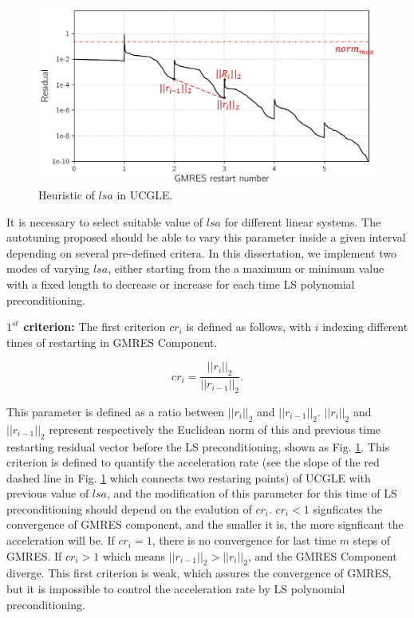 \begin{figure}[htbp]
	\centering
	\includegraphics[width=0.99\linewidth]{fig/convergence_tuning.pdf}
	\caption{Heuristic of $lsa$ in UCGLE.}
	\label{fig:cos}
\end{figure}

It is necessary to select suitable value of $lsa$ for different linear systems. The autotuning proposed should be able to vary this parameter inside a given interval depending on several pre-defined critera. In this dissertation, we implement two modes of varying $lsa$, either starting from the a maximum or minimum value with a fixed length to decrease or increase for each time LS polynomial preconditioning.

\textbf{$1^{st}$ criterion:} The first criterion $cr_i$ is defined as follows, with $i$ indexing different times of restarting in GMRES Component. 

\begin{equation}
cr_i = \frac{||r_i||_2}{||r_{i-1}||_2}.
\end{equation}

This parameter is defined as a ratio between $||r_i||_2$ and $||r_{i-1}||_2$. $||r_i||_2$ and $||r_{i-1}||_2$ represent respectively the Euclidean norm of this and previous time restarting residual vector before the LS preconditioning, shown as Fig. \ref{fig:cos}. This criterion is defined to quantify the acceleration rate (see the slope of the red dashed line in Fig. \ref{fig:cos} which connects two restaring points) of UCGLE with previous value of $lsa$, and the modification of this parameter for this time of LS preconditioning should depend on the evalution of $cr_i$. $cr_i < 1$ signficates the convergence of GMRES component, and the smaller it is, the more signficant the acceleration will be. If $cr_i=1$, there is no convergence for last time $m$ steps of GMRES. If $cr_i > 1$ which means $||r_{i-1}||_2 > ||r_{i}||_2$, and the GMRES Component diverge. This first criterion is weak, which assures the convergence of GMRES, but it is impossible to control the acceleration rate by LS polynomial preconditioning.

